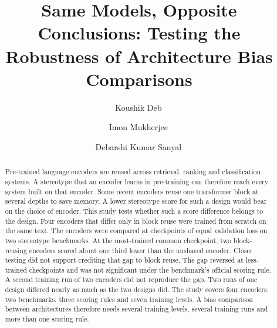 \documentclass[sigconf,natbib=true]{acmart}
\begin{document}
\title{Same Models, Opposite Conclusions: Testing the Robustness of
       Architecture Bias Comparisons}

\author{Koushik Deb\,}

\author{Imon Mukherjee\,}

\author{Debarshi Kumar Sanyal\,}

\renewcommand{\shortauthors}{Deb et al.}

\begin{abstract}
Pre-trained language encoders are reused across retrieval, ranking and
classification systems. A stereotype that an encoder learns in pre-training can
therefore reach every system built on that encoder. Some recent encoders reuse
one transformer block at several depths to save memory. A lower stereotype score
for such a design would bear on the choice of encoder. This study tests whether
such a score difference belongs to the design. Four encoders that differ only in
block reuse were trained from scratch on the same text. The encoders were
compared at checkpoints of equal validation loss on two stereotype benchmarks.
At the most-trained common checkpoint, two block-reusing encoders scored about
one third lower than the unshared encoder. Closer testing did not support
crediting that gap to block reuse. The gap reversed at less-trained checkpoints
and was not significant under the benchmark's official scoring rule. A second training
run of two encoders did not reproduce the gap. Two runs of one design differed
nearly as much as the two designs did. The study covers four encoders, two
benchmarks, three scoring rules and seven training levels. A bias comparison
between architectures therefore needs several training levels, several training
runs and more than one scoring rule.
\end{abstract}
\end{document}
